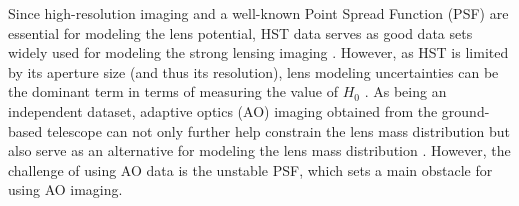 \documentclass[useAMS,usenatbib]{mnras}
\begin{document}
Since high-resolution imaging and a well-known Point Spread Function (PSF) are essential for modeling the lens potential, HST data serves as good data sets widely used for modeling the strong lensing imaging \citep[e.g.,][]{SuyuEtal09,SuyuEtal10,BirrerEtal15,WongEtal17,BirrerEtal16,BirrerEtal18}. However, as HST is limited by its aperture size (and thus its resolution), lens modeling uncertainties can be the dominant term in terms of measuring the value of $H_{0}$ \citep[e.g.,][]{SuyuEtal14}.
As being an independent dataset, adaptive optics (AO) imaging obtained from the ground-based telescope can not only further help constrain the lens mass distribution but also 
serve as an alternative for modeling the lens mass distribution \citep{GChenEtal16}.
However, the challenge of using AO data is the unstable PSF, which sets a main obstacle for using AO imaging. %
\end{document}
